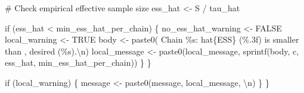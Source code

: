 \documentclass[
  letterpaper,
  DIV=11,
  numbers=noendperiod]{scrartcl}
\newenvironment{Shaded}{\begin{snugshade}}{\end{snugshade}}
\newcommand{\CharTok}[1]{\textcolor[rgb]{0.13,0.47,0.30}{#1}}
\newcommand{\CommentTok}[1]{\textcolor[rgb]{0.37,0.37,0.37}{#1}}
\newcommand{\ControlFlowTok}[1]{\textcolor[rgb]{0.00,0.23,0.31}{#1}}
\newcommand{\NormalTok}[1]{\textcolor[rgb]{0.00,0.23,0.31}{#1}}
\newcommand{\OperatorTok}[1]{\textcolor[rgb]{0.37,0.37,0.37}{#1}}
\newcommand{\SpecialCharTok}[1]{\textcolor[rgb]{0.37,0.37,0.37}{#1}}
\newcommand{\StringTok}[1]{\textcolor[rgb]{0.13,0.47,0.30}{#1}}
\begin{document}
\begin{Shaded}
\begin{Highlighting}[]
      \CommentTok{\# Check empirical effective sample size}
\NormalTok{      ess\_hat }\OperatorTok{\textless{}{-}}\NormalTok{ S }\OperatorTok{/}\NormalTok{ tau\_hat}
      
      \ControlFlowTok{if}\NormalTok{ (ess\_hat }\OperatorTok{\textless{}}\NormalTok{ min\_ess\_hat\_per\_chain) \{}
\NormalTok{        no\_ess\_hat\_warning }\OperatorTok{\textless{}{-}}\NormalTok{ FALSE}
\NormalTok{        local\_warning }\OperatorTok{\textless{}{-}}\NormalTok{ TRUE}
\NormalTok{        body }\OperatorTok{\textless{}{-}}\NormalTok{ paste0(}\StringTok{\textquotesingle{}  Chain }\SpecialCharTok{\%s}\StringTok{: hat}\SpecialCharTok{\{ESS\}}\StringTok{ (}\SpecialCharTok{\%.3f}\StringTok{) is smaller than \textquotesingle{}}\NormalTok{,}
                       \StringTok{\textquotesingle{}desired (}\SpecialCharTok{\%s}\StringTok{).}\CharTok{\textbackslash{}n}\StringTok{\textquotesingle{}}\NormalTok{)}
\NormalTok{        local\_message }\OperatorTok{\textless{}{-}}\NormalTok{ paste0(local\_message,}
\NormalTok{                                sprintf(body, c, ess\_hat,}
\NormalTok{                                        min\_ess\_hat\_per\_chain))}
\NormalTok{      \}}
\NormalTok{    \}}
    
    \ControlFlowTok{if}\NormalTok{ (local\_warning) \{}
\NormalTok{      message }\OperatorTok{\textless{}{-}}\NormalTok{ paste0(message, local\_message, }\StringTok{\textquotesingle{}}\CharTok{\textbackslash{}n}\StringTok{\textquotesingle{}}\NormalTok{)}
\NormalTok{    \}}
\NormalTok{  \}}


\end{Highlighting}
\end{Shaded}
\end{document}
